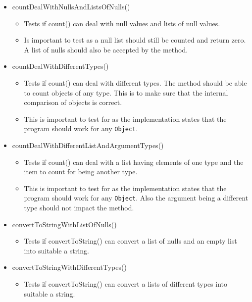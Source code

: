\documentclass{article}
\begin{document}
\begin{itemize}

\item countDealWithNullsAndListsOfNulls()
\begin{itemize}
\item Tests if count() can deal with null values and lists of null values.
\item Is important to test as a null list should still be counted and return zero. A list of nulls should also be accepted by the method.
\end{itemize}

\item countDealWithDifferentTypes()
\begin{itemize}
\item Tests if count() can deal with different types. The method should be able to count objects of any type. This is to make sure that the internal comparison of objects is correct.
\item This is important to test for as the implementation states that the program should work for any \verb+Object+.
\end{itemize}

\item countDealWithDifferentListAndArgumentTypes()
\begin{itemize}
\item Tests if count() can deal with a list having elements of one type and the item to count for being another type.
\item This is important to test for as the implementation states that the program should work for any \verb+Object+. Also the argument being a different type should not impact the method.
\end{itemize}

\item convertToStringWithListOfNulls()
\begin{itemize}
\item Tests if convertToString() can convert a list of nulls and an empty list into suitable a string.
\end{itemize}

\item convertToStringWithDifferentTypes()
\begin{itemize}
\item Tests if convertToString() can convert a lists of different types into suitable a string.
\end{itemize}


\end{itemize}
\end{document}
